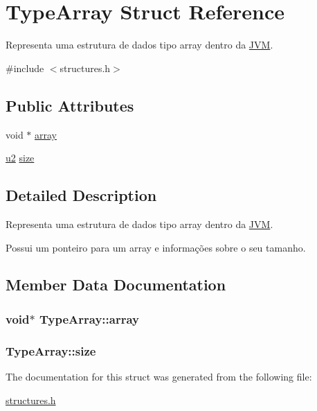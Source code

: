 \hypertarget{structTypeArray}{}\section{Type\+Array Struct Reference}
\label{structTypeArray}


Representa uma estrutura de dados tipo array dentro da \hyperlink{structJVM}{J\+VM}.  




{\ttfamily \#include $<$structures.\+h$>$}

\subsection*{Public Attributes}
\begin{DoxyCompactItemize}
\item 
void $\ast$ \hyperlink{structTypeArray_a6126c1f56950b1821af98aa19d4c5cdc}{array}
\item 
\hyperlink{structures_8h_a55ef8d87fd202b8417704c089899c5b9}{u2} \hyperlink{structTypeArray_a51c37b7d51078be5f6f6dc83c58fdb22}{size}
\end{DoxyCompactItemize}


\subsection{Detailed Description}
Representa uma estrutura de dados tipo array dentro da \hyperlink{structJVM}{J\+VM}. 

Possui um ponteiro para um array e informações sobre o seu tamanho. 

\subsection{Member Data Documentation}
\subsubsection[{\texorpdfstring{array}{array}}]{\setlength{\rightskip}{0pt plus 5cm}void$\ast$ Type\+Array\+::array}\hypertarget{structTypeArray_a6126c1f56950b1821af98aa19d4c5cdc}{}\label{structTypeArray_a6126c1f56950b1821af98aa19d4c5cdc}
\subsubsection[{\texorpdfstring{size}{size}}]{ Type\+Array\+::size}\hypertarget{structTypeArray_a51c37b7d51078be5f6f6dc83c58fdb22}{}\label{structTypeArray_a51c37b7d51078be5f6f6dc83c58fdb22}


The documentation for this struct was generated from the following file\+:\begin{DoxyCompactItemize}
\item 
\hyperlink{structures_8h}{structures.\+h}\end{DoxyCompactItemize}

